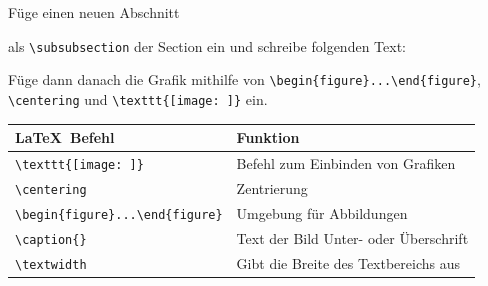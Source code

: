 \documentclass["WS\space 16-17\space -\space LaTeX-Kurs\space -\space Praesentation\space -\space 2.tex"]{subfiles}
\begin{document}
\begin{frame}[fragile]
	\Aufgabee
		Füge einen neuen Abschnitt
		
		\textrm{}
		
		als \lstinline[basicstyle=\normalfont\ttfamily\normalsize]|\subsubsection| der Section  ein und schreibe folgenden Text:
		
		\textrm{}
		
		Füge dann danach die Grafik  mithilfe von \lstinline[basicstyle=\normalfont\ttfamily\normalsize]|\begin{figure}...\end{figure}|, \lstinline[basicstyle=\normalfont\ttfamily\normalsize]|\centering| und \lstinline[basicstyle=\normalfont\ttfamily\normalsize]|\texttt{[image: ]}| ein.
	\btVFill\Befehle
	\begin{center}
		\begin{tabular}{ll}
			\toprule
			\LaTeX\ Befehl								&	Funktion								\\ \midrule
			\lstinline|\texttt{[image: ]}|			&	Befehl zum Einbinden von Grafiken		\\ 
			\lstinline|\centering|						&	Zentrierung								\\
			\lstinline|\begin{figure}...\end{figure}|	&	Umgebung für Abbildungen				\\
			\lstinline|\caption{}|						&	Text der Bild Unter- oder Überschrift	\\
			\lstinline|\textwidth|						&	Gibt die Breite des Textbereichs aus	\\
			\bottomrule
		\end{tabular}
	\end{center}
\end{frame}
\end{document}
